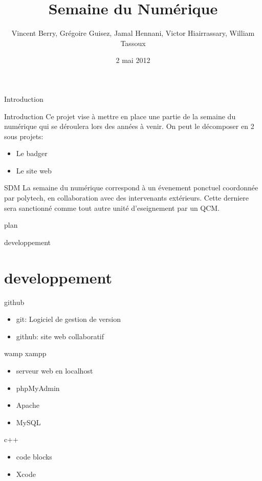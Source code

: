\documentclass{beamer}
\title{Semaine du Numérique}
\author{Vincent Berry, Grégoire Guisez, Jamal Hennani, Victor Hiairrassary, William Tassoux}
\institute{Polytech' Montpellier, Lirmm}
\date{2 mai 2012}
\begin{document}
\small 


\begin{frame}
    \titlepage
\end{frame}



\begin{frame}{Introduction}
        \begin{block}{Introduction}
 		 Ce projet vise à mettre en place une partie de la semaine du numérique qui se déroulera lors des années à venir.
		 On peut le décomposer en 2 sous projets:
		\begin{itemize}
			\item Le badger
			\item Le site web
		\end{itemize}
	\end{block}

    	\begin{block}{SDM}
 		 La semaine du numérique correspond à un évenement ponctuel coordonnée par polytech, en collaboration avec des intervenants extérieurs. 			 Cette derniere sera sanctionné comme tout autre unité d'eseignement par un QCM.
	\end{block}	
\end{frame}


\begin{frame}{plan}

 	\tableofcontents
\end{frame}

\begin{frame}{developpement}
 \section{developpement}

	\begin{block}{github}
		\begin{itemize}
			\item git: Logiciel de gestion de version
			\item github: site web collaboratif
		\end{itemize}
	\end{block}

	\begin{block}{wamp xampp}
		\begin{itemize}
			\item serveur web en localhost
			\item phpMyAdmin
			\item Apache
			\item MySQL
		\end{itemize}
	\end{block}

	\begin{block}{c++}
		\begin{itemize}
			\item code blocks
			\item Xcode
		\end{itemize}
	\end{block}

\end{frame}
\end{document}
